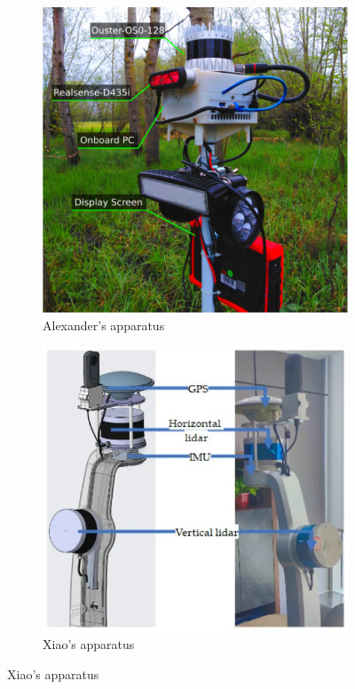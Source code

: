 \begin{figure}[H]
    \centering
    \begin{subfigure}{0.45\textwidth}
        \includegraphics[width=0.8\linewidth]{images/background/alexandar_apparatus.jpg}
        \caption{Alexander's apparatus \cite{proudman_online_2021}}
        \label{fig: Alexander apparatus}
    \end{subfigure}
    \begin{subfigure}{0.45\textwidth}
        \includegraphics[width=0.875\linewidth]{images/background/xiao_apparatus.jpg}
        \caption{Xiao's apparatus \cite{xiao_high-precision_2022}}

\end{subfigure}
\end{figure}
